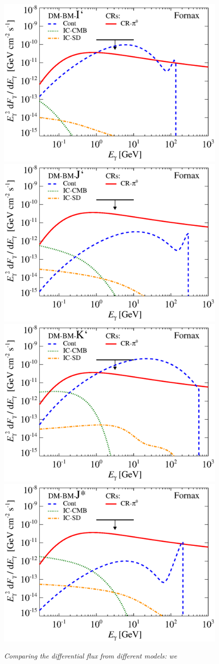 \documentclass[10pt,aps,pra,reprint,amsmath,amsfonts,amssymb,showpacs]{revtex4-1}
\begin{document}
\begin{figure}
\begin{minipage}{2.0\columnwidth}
 \includegraphics[width=0.49\columnwidth]{figures/flux.BMcompI.v11.0.1deg.1.6T.SubMass.IR2.noMW.woGal.eps}
\includegraphics[width=0.49\columnwidth]{figures/flux.BMcompJ.v11.0.1deg.1.6T.SubMass.IR2.noMW.woGal.eps}
\includegraphics[width=0.49\columnwidth]{figures/flux.BMcompK.v11.0.1deg.1.6T.SubMass.IR2.noMW.woGal.eps}
\includegraphics[width=0.49\columnwidth]{figures/flux.BMcompJs.v11.0.1deg.1.6T.SubMass.IR2.noMW.woGal.eps}
\caption{\it Comparing the differential flux from different models: we
}
\end{minipage}
\end{figure}
\end{document}
